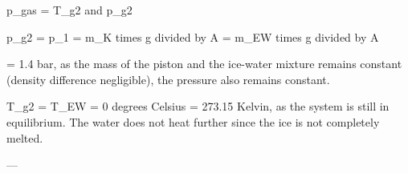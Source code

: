 p_gas = T_g2 and p_g2  

p_g2 = p_1 = m_K times g divided by A = m_EW times g divided by A  

= 1.4 bar, as the mass of the piston and the ice-water mixture remains constant (density difference negligible), the pressure also remains constant.  

T_g2 = T_EW = 0 degrees Celsius = 273.15 Kelvin, as the system is still in equilibrium. The water does not heat further since the ice is not completely melted.  

---